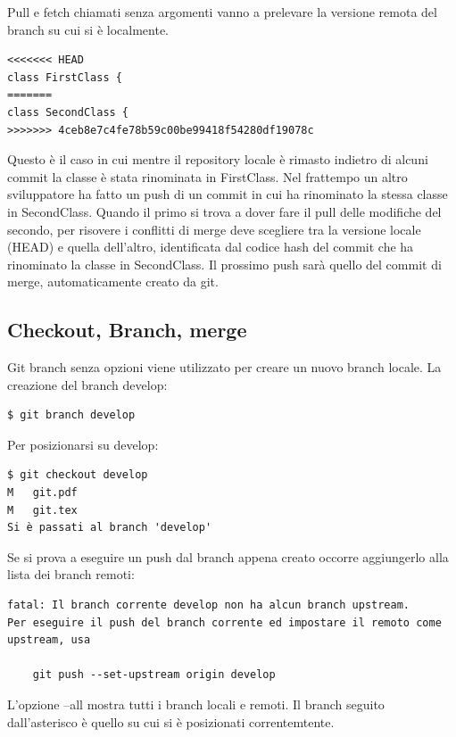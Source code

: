 \documentclass{article} \usepackage[textwidth=18cm,textheight=18cm]{geometry}
\begin{document}
Pull e fetch chiamati senza argomenti vanno a prelevare la versione remota del
branch su cui si è localmente.

\begin{verbatim}
<<<<<<< HEAD
class FirstClass {
=======
class SecondClass {
>>>>>>> 4ceb8e7c4fe78b59c00be99418f54280df19078c
\end{verbatim}

Questo è il caso in cui mentre il repository locale è rimasto indietro di alcuni
commit la classe è stata rinominata in FirstClass. Nel frattempo un altro
sviluppatore ha fatto un push di un commit in cui ha rinominato la stessa classe in
SecondClass. Quando il primo si trova a dover fare il pull delle modifiche del
secondo, per risovere i conflitti di merge deve scegliere tra la versione locale
(HEAD) e quella dell'altro,
identificata dal codice hash del commit che ha rinominato la classe in
SecondClass. Il prossimo push sarà quello del commit di merge, automaticamente
creato da git.

\subsection{Checkout, Branch, merge}

Git branch senza opzioni viene utilizzato per creare un nuovo branch locale. La
creazione del branch develop:

\begin{verbatim}
$ git branch develop
\end{verbatim}

Per posizionarsi su develop:

\begin{verbatim}
$ git checkout develop
M	git.pdf
M	git.tex
Si è passati al branch 'develop'
\end{verbatim}

Se si prova a eseguire un push dal branch appena creato occorre
aggiungerlo alla lista dei branch remoti:

\begin{verbatim}
fatal: Il branch corrente develop non ha alcun branch upstream.
Per eseguire il push del branch corrente ed impostare il remoto come upstream, usa

    git push --set-upstream origin develop
\end{verbatim}

L'opzione --all mostra tutti i branch locali e remoti. Il branch seguito
dall'asterisco è quello su cui si è posizionati correntemtente.
\end{document}
